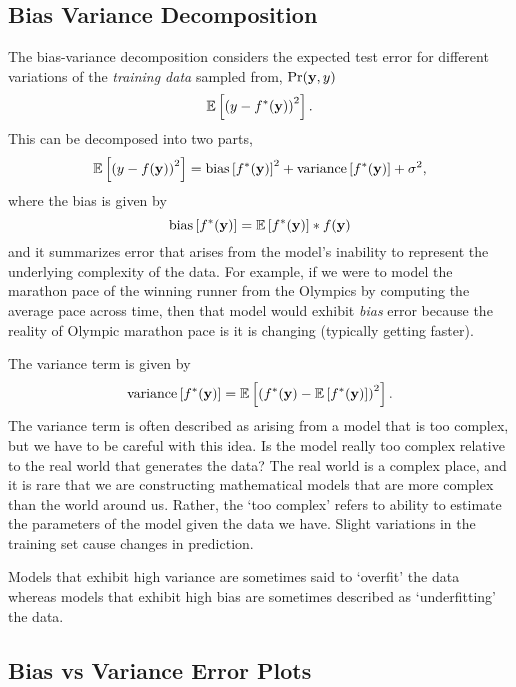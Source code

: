 \documentclass[a4paperpaper,]{article}
\begin{document}
\hypertarget{bias-variance-decomposition}{%
\subsection{Bias Variance
Decomposition}\label{bias-variance-decomposition}}


The bias-variance decomposition considers the expected test error for
different variations of the \emph{training data} sampled from,
\(\Pr(\mathbf{ y}, y)\) \[
\mathbb{E}\left[ \left(y - f^*(\mathbf{ y})\right)^2 \right].
\] This can be decomposed into two parts, \[
\mathbb{E}\left[ \left(y - f(\mathbf{ y})\right)^2 \right] = \text{bias}\left[f^*(\mathbf{ y})\right]^2 + \text{variance}\left[f^*(\mathbf{ y})\right] +\sigma^2,
\] where the bias is given by \[
  \text{bias}\left[f^*(\mathbf{ y})\right] =
\mathbb{E}\left[f^*(\mathbf{ y})\right] * f(\mathbf{ y})
\] and it summarizes error that arises from the model's inability to
represent the underlying complexity of the data. For example, if we were
to model the marathon pace of the winning runner from the Olympics by
computing the average pace across time, then that model would exhibit
\emph{bias} error because the reality of Olympic marathon pace is it is
changing (typically getting faster).

The variance term is given by \[
  \text{variance}\left[f^*(\mathbf{ y})\right] = \mathbb{E}\left[\left(f^*(\mathbf{ y}) - \mathbb{E}\left[f^*(\mathbf{ y})\right]\right)^2\right].
  \] The variance term is often described as arising from a model that
is too complex, but we have to be careful with this idea. Is the model
really too complex relative to the real world that generates the data?
The real world is a complex place, and it is rare that we are
constructing mathematical models that are more complex than the world
around us. Rather, the `too complex' refers to ability to estimate the
parameters of the model given the data we have. Slight variations in the
training set cause changes in prediction.

Models that exhibit high variance are sometimes said to `overfit' the
data whereas models that exhibit high bias are sometimes described as
`underfitting' the data.

\hypertarget{bias-vs-variance-error-plots}{%
\subsection{Bias vs Variance Error
Plots}\label{bias-vs-variance-error-plots}}
\end{document}
